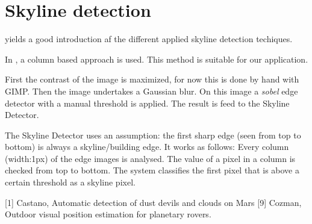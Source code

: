 \section{Skyline detection}
\cite{9} yields a good introduction af the different applied skyline detection
techiques.

In \cite{1}, a column based approach is used. This method is suitable for our
application.

First the contrast of the image is maximized, for now this is done by hand with
GIMP.  Then the image undertakes a Gaussian blur.  On this image a
\textit{sobel} edge detector with a manual threshold is applied.
The result is feed to the Skyline Detector.

The Skyline Detector uses an assumption: the first sharp edge (seen from top to
bottom) is always a skyline/building edge.  It works as follows:
Every column (width:1px) of the edge images is analysed. The value of a pixel
in a column is checked from top to bottom. The system classifies the first
pixel that is above a certain threshold as a skyline pixel.

[1] Castano, Automatic detection of dust devils and clouds on Mars
[9] Cozman, Outdoor visual position estimation for planetary rovers.
